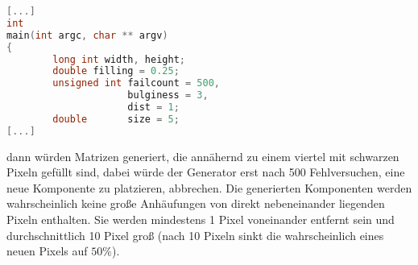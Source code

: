 \begin{lstlisting}[language=C, aboveskip=\baselineskip, basicstyle=\footnotesize\ttfamily, lineskip=0pt]
[...]
int
main(int argc, char ** argv)
{
        long int width, height;
        double filling = 0.25;
        unsigned int failcount = 500,
                     bulginess = 3,
                     dist = 1;
        double       size = 5;
[...]
\end{lstlisting}

dann würden Matrizen generiert, die annähernd zu einem viertel mit schwarzen Pixeln gefüllt sind, dabei würde der Generator erst nach 500 Fehlversuchen, eine neue Komponente zu platzieren, abbrechen. Die generierten Komponenten werden wahrscheinlich keine große Anhäufungen von direkt nebeneinander liegenden Pixeln enthalten. Sie werden mindestens 1 Pixel voneinander entfernt sein und durchschnittlich 10 Pixel groß (nach 10 Pixeln sinkt die wahrscheinlich eines neuen Pixels auf $50\%$).